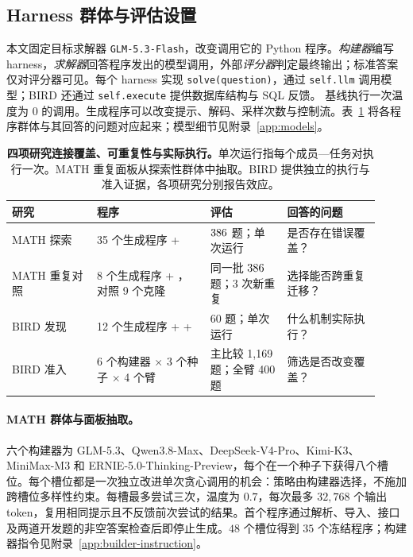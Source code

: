 \subsection{Harness 群体与评估设置}
\label{sec:interface}
本文固定目标求解器 \texttt{GLM-5.3-Flash}，改变调用它的 Python 程序。\emph{构建器}编写 harness，\emph{求解器}回答程序发出的模型调用，外部\emph{评分器}判定最终输出；标准答案仅对评分器可见。每个 harness 实现 \texttt{solve(question)}，通过 \texttt{self.llm} 调用模型；BIRD 还通过 \texttt{self.execute} 提供数据库结构与 SQL 反馈。\bare{} 基线执行一次温度为 $0$ 的调用。生成程序可以改变提示、解码、采样次数与控制流。表~\ref{tab:study-map} 将各程序群体与其回答的问题对应起来；模型细节见附录~\ref{app:models}。

\begin{table}[t]
\centering\small
\setlength{\tabcolsep}{4pt}
\begin{tabular}{@{}p{0.21\linewidth}p{0.29\linewidth}p{0.19\linewidth}p{0.23\linewidth}@{}}
\toprule
研究 & 程序 & 评估 & 回答的问题 \\
\midrule
MATH 探索 & 35 个生成程序 + \bare{} & $386$ 题；单次运行 & 是否存在错误覆盖？ \\
MATH 重复对照 & 8 个生成程序 + \bare{}，对照 9 个克隆 & 同一批 $386$ 题；3 次新重复 & 选择能否跨重复迁移？ \\
BIRD 发现 & 12 个生成程序 + \bare{} + \react{} & 60 题；单次运行 & 什么机制实际执行？ \\
BIRD 准入 & 6 个构建器 $\times$ 3 个种子 $\times$ 4 个臂 & 主比较 1,169 题；全臂 400 题 & 筛选是否改变覆盖？ \\
\bottomrule
\end{tabular}
\caption{\textbf{四项研究连接覆盖、可重复性与实际执行。}单次运行指每个成员—任务对执行一次。MATH 重复面板从探索性群体中抽取。BIRD 提供独立的执行与准入证据，各项研究分别报告效应。}
\label{tab:study-map}
\end{table}

\paragraph{MATH 群体与面板抽取。}
\label{sec:math-setup}
六个构建器为 GLM-5.3、Qwen3.8-Max、DeepSeek-V4-Pro、Kimi-K3、MiniMax-M3 和 ERNIE-5.0-Thinking-Preview，每个在一个种子下获得八个槽位。每个槽位都是一次独立改进单次贪心调用的机会：策略由构建器选择，不施加跨槽位多样性约束。每槽最多尝试三次，温度为 $0.7$，每次最多 $32{,}768$ 个输出 token，复用相同提示且不反馈前次尝试的结果。首个程序通过解析、导入、接口及两道开发题的非空答案检查后即停止生成。$48$ 个槽位得到 $35$ 个冻结程序；构建器指令见附录~\ref{app:builder-instruction}。

